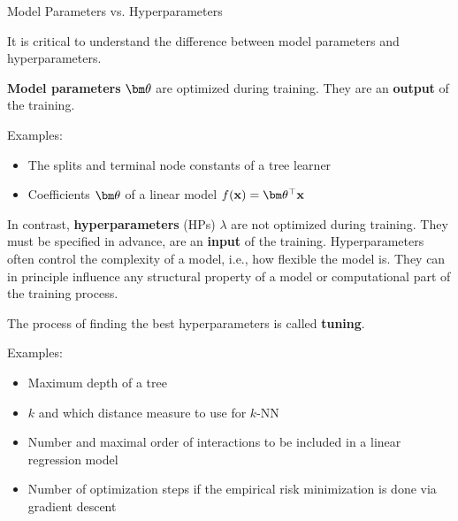 \documentclass[11pt,compress,t,notes=noshow, xcolor=table]{beamer}
\begin{document}
\begin{vbframe}{Model Parameters vs. Hyperparameters}

It is critical to understand the difference between model parameters and hyperparameters. 

\lz

\textbf{Model parameters} $\thetav$ are optimized during training. %
They are an \textbf{output} of the training. 

\lz

Examples:
\begin{itemize}
\item The splits and terminal node constants of a tree learner 
\item Coefficients $\thetav$ of a linear model $\fx = \thx$
\end{itemize}

\framebreak

In contrast, \textbf{hyperparameters} (HPs) $\lambda$ are not optimized during training. They must be specified in advance, are an \textbf{input} of the training. 
Hyperparameters often control the complexity of a model, i.e., how flexible the model is.
They can in principle influence any structural property of a model or computational part of the training process.

\lz

\vspace{-0.2em}

The process of finding the best hyperparameters is called \textbf{tuning}.

\lz

\vspace{-0.2em}

Examples:

\begin{itemize}
\item Maximum depth of a tree 
\item $k$ and which distance measure to use for $k$-NN
\item Number and maximal order of interactions to be included in a linear regression model
\item Number of optimization steps if the empirical risk minimization
is done via gradient descent
\end{itemize}

\end{vbframe}
\end{document}
